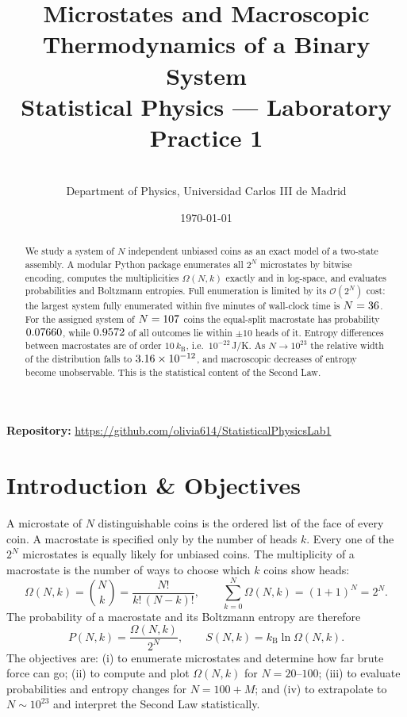 \documentclass[11pt, a4paper]{article}
\title{\textbf{Microstates and Macroscopic Thermodynamics of a Binary System}\\
\large Statistical Physics --- Laboratory Practice 1}
\author{\\[0.3em]
\small Department of Physics, Universidad Carlos III de Madrid}
\date{\today}
\newcommand{\kB}{k_{\mathrm{B}}}
\begin{document}
\maketitle

\begin{abstract}
\noindent We study a system of $N$ independent unbiased coins as an exact model of a two-state assembly. A modular Python package enumerates all $2^N$ microstates by bitwise encoding, computes the multiplicities $\Omega(N,k)$ exactly and in log-space, and evaluates probabilities and Boltzmann entropies. Full enumeration is limited by its $\mathcal{O}(2^N)$ cost: the largest system fully enumerated within five minutes of wall-clock time is $N=36$. For the assigned system of $N=107$ coins the equal-split macrostate has probability $0.07660$, while $0.9572$ of all outcomes lie within $\pm10$ heads of it. Entropy differences between macrostates are of order $10\,\kB$, i.e.\ $10^{-22}$\,J/K. As $N\to10^{23}$ the relative width of the distribution falls to $3.16\times10^{-12}$, and macroscopic decreases of entropy become unobservable. This is the statistical content of the Second Law.
\end{abstract}

\vspace{0.5em}
\noindent \textbf{Repository:} \url{https://github.com/olivia614/StatisticalPhysicsLab1}

\vspace{1em}

\section{Introduction \& Objectives}
A microstate of $N$ distinguishable coins is the ordered list of the face of every coin. A macrostate is specified only by the number of heads $k$. Every one of the $2^N$ microstates is equally likely for unbiased coins. The multiplicity of a macrostate is the number of ways to choose which $k$ coins show heads:
\begin{equation}
\Omega(N,k) = \binom{N}{k} = \frac{N!}{k!\,(N-k)!}, \qquad \sum_{k=0}^{N}\Omega(N,k)=(1+1)^N = 2^N .
\label{eq:omega}
\end{equation}
The probability of a macrostate and its Boltzmann entropy are therefore
\begin{equation}
P(N,k) = \frac{\Omega(N,k)}{2^{N}}, \qquad S(N,k) = \kB \ln \Omega(N,k).
\label{eq:PS}
\end{equation}
The objectives are: (i) to enumerate microstates and determine how far brute force can go; (ii) to compute and plot $\Omega(N,k)$ for $N=20$--$100$; (iii) to evaluate probabilities and entropy changes for $N=100+M$; and (iv) to extrapolate to $N\sim10^{23}$ and interpret the Second Law statistically.
\end{document}
